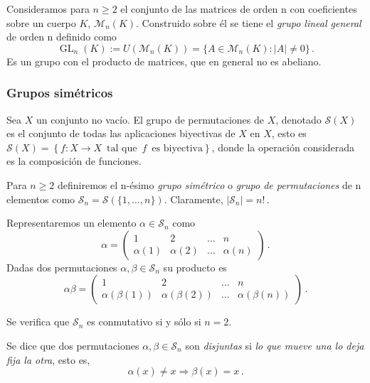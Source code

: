 Consideramos para $n \ge 2$ el conjunto de las matrices de orden n con coeficientes sobre un cuerpo $K$, $\mathcal M_n(K)$. Construido sobre él se tiene el \textit{grupo lineal general} de orden n definido como \begin{equation*}
  \operatorname{GL}_n(K) := U(\mathcal M_n(K)) = \{A \in \mathcal M_n(K) : |A| \neq 0\}\,.
\end{equation*}Es un grupo con el producto de matrices, que en general no es abeliano.

\subsubsection{Grupos simétricos}

Sea $X$ un conjunto no vacío. El grupo de permutaciones de $X$, denotado $\mathcal S(X)$ es el conjunto de todas las aplicaciones biyectivas de $X$ en $X$, esto es $\mathcal S(X) = \left\{f:X \rightarrow X \, \text{ tal que } \, f \, \text{ es biyectiva}\right\}$, donde la operación considerada es la composición de funciones.

Para $n \ge 2$ definiremos el n-ésimo \textit{grupo simétrico} o \textit{grupo de permutaciones} de n elementos como $\mathcal S_n = \mathcal S(\{1,\hdots,n\})$. Claramente, $|\mathcal S_n| = n!$\,.

Representaremos un elemento $\alpha \in \mathcal S_n$ como \begin{equation*}
  \alpha = \begin{pmatrix}
    1 & 2 & \hdots & n \\
    \alpha(1) & \alpha(2) & \hdots & \alpha(n) 
  \end{pmatrix}\,.
\end{equation*}
Dadas dos permutaciones $\alpha,\beta \in \mathcal S_n$ su producto es \begin{equation*}
  \alpha \beta = \begin{pmatrix}
    1 & 2 & \hdots & n \\
    \alpha(\beta(1)) & \alpha(\beta(2)) & \hdots & \alpha(\beta(n))
  \end{pmatrix}\,.
\end{equation*}

Se verifica que $\mathcal S_n$ es conmutativo si y sólo si $n=2$.

\begin{ndef}
Se dice que dos permutaciones $\alpha,\beta \in \mathcal S_n$ son \textit{disjuntas} si \textit{lo que mueve una lo deja fija la otra}, esto es, \begin{equation*}
  \alpha(x) \neq x \Rightarrow \beta(x) = x\,.
\end{equation*}
\end{ndef}


